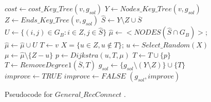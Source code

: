 \begin{figure}[H]
\begin{algorithm}[H]
\caption{$(g_{sol},improve) = General\_RecConnect(G_B,C,g_{sol},v,\overline{S})$}
\begin{algorithmic}[1]
\STATE $cost \leftarrow cost\_Key\_Tree(v,g_{sol})$
\STATE $Y \leftarrow Nodes\_Key\_Tree(v,g_{sol})$
\STATE $Z \leftarrow Ends\_Key\_Tree(v,g_{sol})$
\STATE $\hat{S} \leftarrow Y\setminus Z \cup \overline{S}$
\STATE $U \leftarrow \{(i,j) \in G_B: i\in Z, j\in \hat{S}\}$
\STATE $\hat{\mu} \leftarrow <NODES(\hat{S} \cap G_B) > $; $ \hat{\mu} \leftarrow \hat{\mu} \cup U$ 
\STATE $T \leftarrow v$
\STATE $X = \{u\in Z, u \notin T\}$; $u \leftarrow Select\_Random(X)$
\STATE $\mu \leftarrow \hat{\mu}\setminus \{Z-u\}$
\STATE $p \leftarrow Dijkstra(u,T,\mu)$
\STATE $T \leftarrow T \cup \{p\}$
\ENDWHILE
\STATE $T \leftarrow RemoveDegree1(\overline{S},T)$
\STATE $g_{sol} \leftarrow \{ g_{sol}\setminus  (Y\setminus Z) \} \cup \{T\}$
\STATE $improve \leftarrow TRUE$
\ELSE
\STATE $improve \leftarrow FALSE$
\ENDIF
\RETURN $(g_{sol},improve)$
\end{algorithmic}
\end{algorithm}
\caption{Pseudocode for $General\_RecConnect$ \cite{11}. \label{genrec}}
\end{figure}


